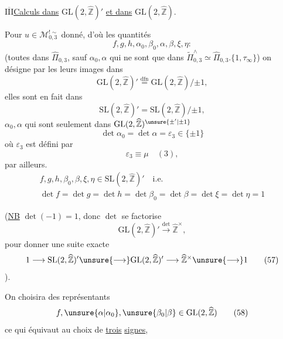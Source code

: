 \uline{$\overline{\mathrm{III}}$}\quad \uline{Calculs dans} $\mathrm{GL}(2,\widehat{\mathbb Z})'$ \uline{et dans} $\mathrm{GL}(2,\widehat{\mathbb Z})$.

Pour $u\in\mathcal M_{0,3}^{!\sim}$ donné, d'où les quantités
\[
f,g,h,\alpha_0,\beta_0,\alpha,\beta,\xi,\eta:
\tag{53}
\]
(toutes dans $\widehat{\Pi}_{0,3}$, sauf $\alpha_0,\alpha$ qui ne sont que dans $\widetilde{\Pi}_{0,3}^{\wedge}\simeq\widehat{\Pi}_{0,3}.\{1,\tau_\infty\}$) on désigne par les  leurs images dans 
\[
\mathrm{GL}(2,\widehat{\mathbb Z})'\stackrel{\mathrm{dfn}}{=}\mathrm{GL}(2,\widehat{\mathbb Z})/\mathord{\pm}1,
\]
elles sont en fait dans
\[
\mathrm{SL}(2,\widehat{\mathbb Z})'=\mathrm{SL}(2,\widehat{\mathbb Z})/\mathord{\pm}1,
\]
 $\alpha_0,\alpha$ qui sont seulement dans $\mathrm{GL}(2,\widehat{\mathbb Z})^{\unsure{\pm'|\pm1}}$
\[
\det\alpha_0=\det\alpha=\varepsilon_3\in\{\pm1\}
\tag{54}
\]
où $\varepsilon_3$ est défini par
\[
\varepsilon_3\equiv\mu\quad(3),
\tag{55}
\]
 par ailleurs.
\[
\begin{gathered}
f,g,h,\beta_0,\beta,\xi,\eta\in\mathrm{SL}(2,\widehat{\mathbb Z})'\quad\text{i.e.}\\
\det f=\det g=\det h=\det\beta_0=\det\beta=\det\xi=\det\eta=1
\end{gathered}
\tag{56}
\]

(\uline{NB}   $\det(-1)=1$, donc $\det$ se factorise
\[
\mathrm{GL}(2,\widehat{\mathbb Z})'\xrightarrow{\det}\widehat{\mathbb Z}^{\times},
\]
pour donner une suite exacte
\[
1\longrightarrow\mathrm{SL}(2,\widehat{\mathbb Z})'\unsure{\longrightarrow}\mathrm{GL}(2,\widehat{\mathbb Z})'\longrightarrow\widehat{\mathbb Z}^{\times}\unsure{\longrightarrow}1
\tag{57}
\]
).

On choisira des représentants
\[
f,\unsure{\alpha|\alpha_0},\unsure{\beta_0|\beta}\in\mathrm{GL}(2,\widehat{\mathbb Z})
\tag{58}
\]
ce qui équivaut au choix de \uline{trois} \uline{signes},

